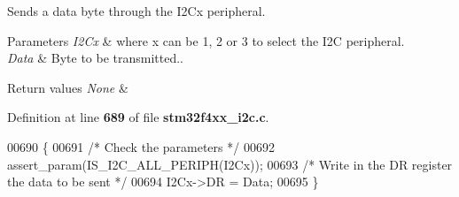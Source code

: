 Sends a data byte through the I2\+Cx peripheral. 


\begin{DoxyParams}{Parameters}
{\em I2\+Cx} & where x can be 1, 2 or 3 to select the I2C peripheral. \\
\hline
{\em Data} & Byte to be transmitted.. \\
\hline
\end{DoxyParams}

\begin{DoxyRetVals}{Return values}
{\em None} & \\
\hline
\end{DoxyRetVals}


Definition at line \textbf{ 689} of file \textbf{ stm32f4xx\+\_\+i2c.\+c}.


\begin{DoxyCode}
00690 \{
00691   \textcolor{comment}{/* Check the parameters */}
00692   assert_param(IS_I2C_ALL_PERIPH(I2Cx));
00693   \textcolor{comment}{/* Write in the DR register the data to be sent */}
00694   I2Cx->DR = Data;
00695 \}
\end{DoxyCode}
